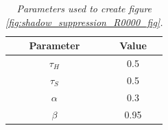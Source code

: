 \begin{table}[htb]
\centering
\begin{tabular}{|c|c|}
	\hline
	Parameter & Value  \\
	\hline
	$\tau_H$ &  0.5 \\
	\hline
	$\tau_S$ & 0.5 \\
	\hline
	$\alpha$ &  0.3 \\
	\hline
	$\beta$ &  0.95 \\
	\hline
\end{tabular}

\caption{\textit{Parameters used to create figure \ref{fig:shadow_suppression_R0000_fig}.}}
\label{tab:shadow_parameters_R0000}
\end{table}
